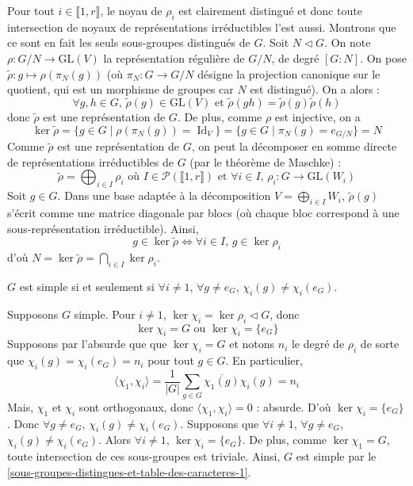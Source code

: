 	\begin{demonstration}
		Pour tout $i \in \llbracket 1, r \rrbracket$, le noyau de $\rho_i$ est clairement distingué et donc toute intersection de noyaux de représentations irréductibles l'est aussi. Montrons que ce sont en fait les seuls sous-groupes distingués de $G$. Soit $N \lhd G$. On note $\rho : G/N \rightarrow \mathrm{GL}(V)$ la représentation régulière de $G/N$, de degré $[G : N]$. On pose $\widetilde{\rho} : g \mapsto \rho(\pi_N(g))$ (où $\pi_N : G \rightarrow G/N$ désigne la projection canonique sur le quotient, qui est un morphisme de groupes car $N$ est distingué). On a alors :
		\[ \forall g, h \in G, \, \widetilde{\rho}(g) \in \mathrm{GL}(V) \text{ et } \widetilde{\rho}(gh) = \widetilde{\rho}(g) \widetilde{\rho}(h) \]
		donc $\widetilde{\rho}$ est une représentation de $G$. De plus, comme $\rho$ est injective, on a
		\[ \ker{\widetilde{\rho}} = \{ g \in G \mid \rho(\pi_N(g)) = \operatorname{Id}_V \} = \{ g \in G \mid \pi_N(g) = e_{G/N} \} = N \]
		Comme $\widetilde{\rho}$ est une représentation de $G$, on peut la décomposer en somme directe de représentations irréductibles de $G$ (par le théorème de Maschke) :
		\[ \widetilde{\rho} = \bigoplus_{i \in I} \rho_i \text{ où } I \in \mathcal{P}(\llbracket 1, r \rrbracket) \text{ et } \forall i \in I, \, \rho_i : G \rightarrow \mathrm{GL}(W_i) \]
		Soit $g \in G$. Dans une base adaptée à la décomposition $V = \bigoplus_{i \in I} W_i$, $\widetilde{\rho}(g)$ s'écrit comme une matrice diagonale par blocs (où chaque bloc correspond à une sous-représentation irréductible). Ainsi,
		\[ g \in \ker{\widetilde{\rho}} \iff \forall i \in I, \, g \in \ker{\rho_i} \]
		d'où $N = \ker{\widetilde{\rho}} = \bigcap_{i \in I} \ker{\rho_i}$.
	\end{demonstration}

	\begin{corollary}
		$G$ est simple si et seulement si $\forall i \neq 1$, $\forall g \neq e_G$, $\chi_i(g) \neq \chi_i(e_G)$.
	\end{corollary}

	\begin{demonstration}
		 Supposons $G$ simple. Pour $i \neq 1$, $\ker{\chi_i} = \ker{\rho_i} \lhd G$, donc
		\[ \ker{\chi_i} = G \text{ ou } \ker{\chi_i} = \{ e_G \} \]
		Supposons par l'absurde que que $\ker{\chi_i} = G$ et notons $n_i$ le degré de $\rho_i$ de sorte que $\chi_i(g) = \chi_i(e_G) = n_i$ pour tout $g \in G$. En particulier,
		\[ \langle \chi_1, \chi_i \rangle = \frac{1}{|G|} \sum_{g \in G} \overline{\chi_1(g)} \chi_i(g) = n_i \]
		Mais, $\chi_1$ et $\chi_i$ sont orthogonaux, donc $\langle \chi_1, \chi_i \rangle = 0$ : absurde. D'où $\ker{\chi_i} = \{ e_G \}$. Donc $\forall g \neq e_G$, $\chi_i(g) \neq \chi_i(e_G)$.
		\newpar
		 Supposons que $\forall i \neq 1$, $\forall g \neq e_G$, $\chi_i(g) \neq \chi_i(e_G)$. Alors $\forall i \neq 1$, $\ker{\chi_i} = \{ e_G \}$. De plus, comme $\ker{\chi_1} = G$, toute intersection de ces sous-groupes est triviale. Ainsi, $G$ est simple par le \cref{sous-groupes-distingues-et-table-des-caracteres-1}.
	\end{demonstration}

